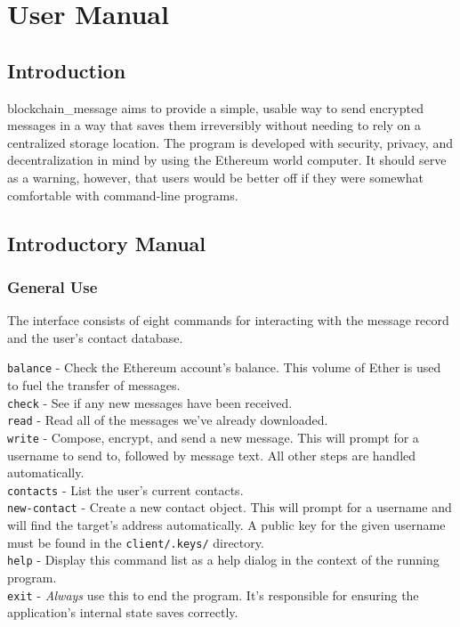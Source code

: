 \documentclass[titlepage]{report}
\begin{document}
\chapter{User Manual}
\section{Introduction}
blockchain\_message aims to provide a simple, usable way to send encrypted messages in a way that saves them irreversibly without needing to rely on a centralized storage location. The program is developed with security, privacy, and decentralization in mind by using the \gls{Ethereum} world computer. It should serve as a warning, however, that users would be better off if they were somewhat comfortable with \gls{command-line} programs.

\section{Introductory Manual}
\subsection{General Use}
The interface consists of eight commands for interacting with the message record and the user's contact database.\\

{\raggedright{}
    \texttt{balance} - Check the Ethereum account's balance. This volume of Ether is used to fuel the transfer of messages.\\
    \texttt{check} - See if any new messages have been received.\\
    \texttt{read} - Read all of the messages we've already downloaded.\\
    \texttt{write} - Compose, encrypt, and send a new message. This will prompt for a username to send to, followed by message text. All other steps are handled automatically.\\
    \texttt{contacts} - List the user's current contacts.\\
    \texttt{new-contact} - Create a new contact object. This will prompt for a username and will find the target's address automatically. A public key for the given username must be found in the \texttt{client/.keys/} directory.\\
    \texttt{help} - Display this command list as a help dialog in the context of the running program.\\
    \texttt{exit} - \textit{Always} use this to end the program. It's responsible for ensuring the application's internal state saves correctly.\\
}
\end{document}
